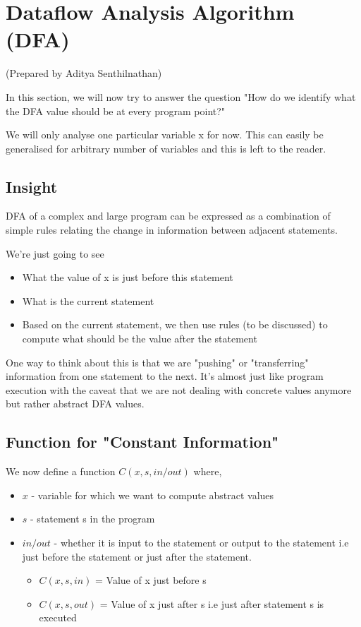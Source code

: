 \section{Dataflow Analysis Algorithm (DFA)}

(Prepared by Aditya Senthilnathan)

In this section, we will now try to answer the question "How do we identify what the DFA value should be at every program point?"

We will only analyse one particular variable x for now. This can easily be generalised for arbitrary number of variables and this is left to the reader.

\subsection{Insight}

DFA of a complex and large program can be expressed as a combination of simple rules relating the change in information between adjacent statements.

\vspace{0.3cm}

We're just going to see
\begin{itemize}
    \item What the value of x is just before this statement
    \item What is the current statement
    \item Based on the current statement, we then use rules (to be discussed) to compute what should be the value after the statement
\end{itemize}

One way to think about this is that we are "pushing" or "transferring" information from one statement to the next. It's almost just like program execution with the caveat that we are not dealing with concrete values anymore but rather abstract DFA values.

\subsection{Function for "Constant Information"}

We now define a function $C(x, s, in/out)$ where,

\begin{itemize}
    \item $x$ - variable for which we want to compute abstract values
    \item $s$ - statement s in the program
    \item $in/out$ - whether it is input to the statement or output to the statement i.e just before the statement or just after the statement.
    \begin{itemize}
        \item $C(x, s, in)$ = Value of x just before s
        \item $C(x, s, out)$ = Value of x just after s i.e just after statement s is executed
    \end{itemize}
\end{itemize}

